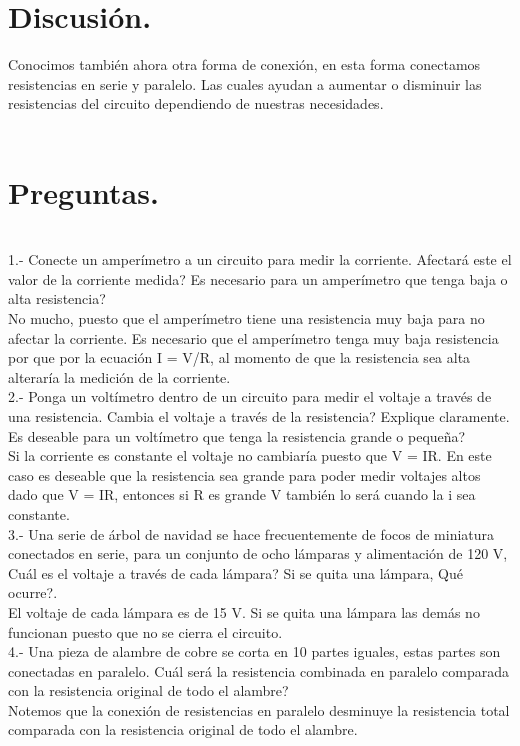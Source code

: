\documentclass[11pt,a4paper]{article}
\begin{document}
\section*{Discusi\'{o}n.}
Conocimos tambi\'{e}n ahora otra forma de conexi\'{o}n, en esta forma conectamos resistencias en serie y paralelo. Las cuales ayudan a  aumentar o disminuir las resistencias del circuito dependiendo de nuestras necesidades.
\\
\\
\section{Preguntas.}
\\
1.- Conecte un amper\'{i}metro a un circuito para medir la corriente. Afectar\'{a} este el valor de la corriente medida? Es necesario para un amper\'{i}metro que tenga baja o alta resistencia?\\
No mucho, puesto que el amper\'{i}metro tiene una resistencia muy baja para no afectar la corriente. Es necesario que el amper\'{i}metro tenga muy baja resistencia por que por la ecuaci\'{o}n I = V/R, al momento de que la resistencia sea alta alterar\'{i}a la medici\'{o}n de la corriente.
\\
2.- Ponga un volt\'{i}metro dentro de un circuito para medir el voltaje a trav\'{e}s de una resistencia. Cambia el voltaje a trav\'{e}s de la resistencia? Explique claramente. Es deseable para un volt\'{i}metro que tenga la resistencia grande o peque\~{n}a?\\
Si la corriente es constante el voltaje no cambiar\'{i}a puesto que V = IR. En este caso es deseable que la resistencia sea grande para poder medir voltajes altos dado que V = IR, entonces si R es grande V tambi\'{e}n lo ser\'{a} cuando la i sea constante.
\\
3.- Una serie de \'{a}rbol de navidad se hace frecuentemente de focos de miniatura conectados en serie, para un conjunto de ocho l\'{a}mparas y alimentaci\'{o}n de 120 V, Cu\'{a}l es el voltaje a trav\'{e}s de cada l\'{a}mpara? Si se quita una l\'{a}mpara, Qu\'{e} ocurre?.
\\
El voltaje de cada l\'{a}mpara es  de 15 V. Si se quita una l\'{a}mpara las dem\'{a}s no funcionan puesto que no se cierra el circuito.
\\
4.- Una pieza de alambre de cobre se corta en 10 partes iguales, estas partes son conectadas en paralelo. Cu\'{a}l ser\'{a} la resistencia combinada en paralelo comparada con la resistencia original de todo el alambre?
\\
Notemos que la conexi\'{o}n de resistencias en paralelo desminuye la resistencia total comparada con la resistencia original de todo el alambre. 
\end{document}

